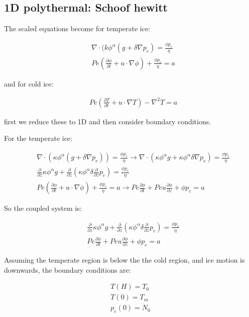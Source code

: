 \documentclass[a4paper,12pt]{article}
\newcommand{\pd}[2]{\frac{\partial #1}{\partial #2}}
\begin{document}
\subsection{1D polythermal: Schoof hewitt}

The scaled equations become for temperate ice:

\begin{align*}
  &\nabla \cdot (k \phi^\alpha( g + \delta \nabla p_e) = \frac{\phi p_e}{\eta} \\
  & Pe \left(\pd{\phi}{t} + u \cdot \nabla \phi \right) + \frac{\phi p_e}{\eta}  = a
\end{align*}

and for cold ice:

\begin{align*}
  & Pe \left(\pd{T}{t} + u \cdot \nabla T\right)  - \nabla^2 T = a
\end{align*}

first we reduce these to 1D and then consider boundary conditions.

For the temperate ice:

\begin{align*}
  &\nabla \cdot (\kappa \phi^\alpha( g + \delta \nabla p_e)) = \frac{\phi p_e}{\eta} \rightarrow \nabla \cdot (\kappa \phi^\alpha g + \kappa\phi^\alpha\delta \nabla p_e) = \frac{\phi p_e}{\eta}\\
  &\pd{}{z}\kappa \phi^\alpha g + \pd{}{z}\left(\kappa\phi^\alpha\delta\pd{}{z}p_e\right) = \frac{\phi p_e}{\eta}\\
  & Pe \left(\pd{\phi}{t} + u \cdot \nabla \phi \right) + \frac{\phi p_e}{\eta}  = a \rightarrow Pe\pd{\phi}{t} + Pe u \pd{\phi}{z} + \phi p_e = a
\end{align*}

So the coupled system is:

\begin{align*}
  &\pd{}{z}\kappa \phi^\alpha g + \pd{}{z}\left(\kappa\phi^\alpha\delta\pd{}{z}p_e\right) = \frac{\phi p_e}{\eta}\\
  &Pe\pd{\phi}{t} + Pe u \pd{\phi}{z} + \phi p_e = a
\end{align*}

Assuming the temperate region is below the the cold region, and ice motion is downwards, the boundary conditions are:

\begin{align*}
  T(H) = T_0\\
  T(0) = T_m\\
  p_e(0) = N_0\\
\end{align*}
\end{document}
